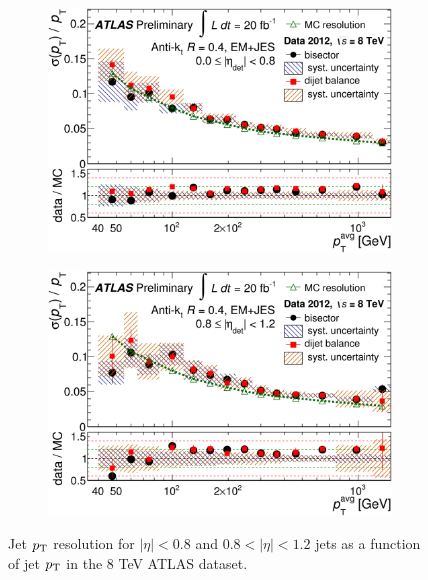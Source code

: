 \begin{figure}[h!]
  \begin{center}
      \begin{subfigure}[b]{0.40\textwidth}   
    \includegraphics[width=\textwidth]{figures/JetCalib/JetCentral_Response.png}             
    \caption{ }
    \end{subfigure}
          \begin{subfigure}[b]{0.40\textwidth}   
    \includegraphics[width=\textwidth]{figures/JetCalib/JetTransition_Response.png}
    \caption{ }
    \end{subfigure}
\end{center}
\caption[Jet $\pt$ resolution for $|\eta|<0.8$ and $0.8<|\eta|<1.2$ jets as a function of jet $\pt$ in the 8 TeV ATLAS dataset]{Jet $\pt$ resolution for $|\eta|<0.8$ and $0.8<|\eta|<1.2$ jets as a function of jet $\pt$ in the 8 TeV ATLAS dataset.\cite{JES_dijet} }
\label{fig:jet_ptresolution} 
\end{figure}

